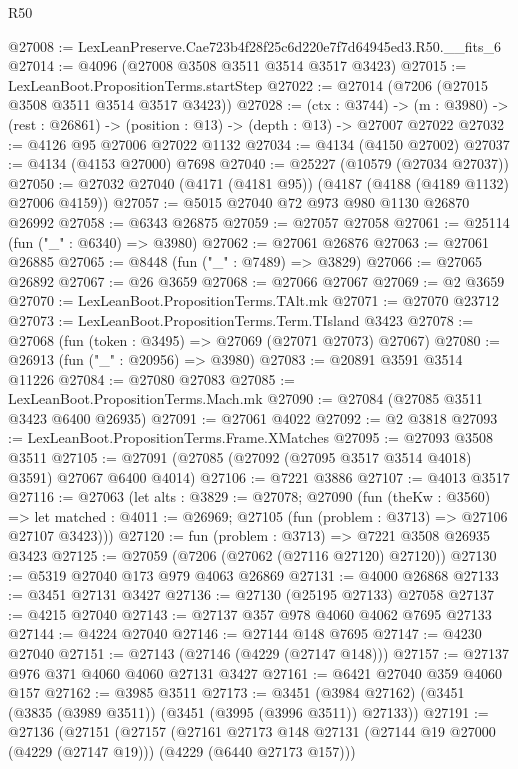 \begin{lexlean}{R50}
\begin{coremodule}
@27008 := LexLeanPreserve.Cae723b4f28f25c6d220e7f7d64945ed3.R50.__fits_6
@27014 := @4096 (@27008 @3508 @3511 @3514 @3517 @3423)
@27015 := LexLeanBoot.PropositionTerms.startStep
@27022 := @27014 (@7206 (@27015 @3508 @3511 @3514 @3517 @3423))
@27028 := (ctx : @3744) ->
  (m : @3980) -> (rest : @26861) -> (position : @13) -> (depth : @13) -> @27007 @27022
@27032 := @4126 @95 @27006 @27022 @1132
@27034 := @4134 (@4150 @27002)
@27037 := @4134 (@4153 @27000) @7698
@27040 := @25227 (@10579 (@27034 @27037))
@27050 := @27032 @27040 (@4171 (@4181 @95)) (@4187 (@4188 (@4189 @1132) @27006 @4159))
@27057 := @5015 @27040 @72 @973 @980 @1130 @26870 @26992
@27058 := @6343 @26875
@27059 := @27057 @27058
@27061 := @25114 (fun ("_" : @6340) => @3980)
@27062 := @27061 @26876
@27063 := @27061 @26885
@27065 := @8448 (fun ("_" : @7489) => @3829)
@27066 := @27065 @26892
@27067 := @26 @3659
@27068 := @27066 @27067
@27069 := @2 @3659
@27070 := LexLeanBoot.PropositionTerms.TAlt.mk
@27071 := @27070 @23712
@27073 := LexLeanBoot.PropositionTerms.Term.TIsland @3423
@27078 := @27068 (fun (token : @3495) => @27069 (@27071 @27073) @27067)
@27080 := @26913 (fun ("_" : @20956) => @3980)
@27083 := @20891 @3591 @3514 @11226
@27084 := @27080 @27083
@27085 := LexLeanBoot.PropositionTerms.Mach.mk
@27090 := @27084 (@27085 @3511 @3423 @6400 @26935)
@27091 := @27061 @4022
@27092 := @2 @3818
@27093 := LexLeanBoot.PropositionTerms.Frame.XMatches
@27095 := @27093 @3508 @3511
@27105 := @27091 (@27085 (@27092 (@27095 @3517 @3514 @4018) @3591) @27067 @6400 @4014)
@27106 := @7221 @3886
@27107 := @4013 @3517
@27116 := @27063
    (let alts : @3829 := @27078;
    @27090
      (fun (theKw : @3560) =>
      let matched : @4011 := @26969; @27105 (fun (problem : @3713) => @27106 @27107 @3423)))
@27120 := fun (problem : @3713) => @7221 @3508 @26935 @3423
@27125 := @27059 (@7206 (@27062 (@27116 @27120) @27120))
@27130 := @5319 @27040 @173 @979 @4063 @26869
@27131 := @4000 @26868
@27133 := @3451 @27131 @3427
@27136 := @27130 (@25195 @27133) @27058
@27137 := @4215 @27040
@27143 := @27137 @357 @978 @4060 @4062 @7695 @27133
@27144 := @4224 @27040
@27146 := @27144 @148 @7695
@27147 := @4230 @27040
@27151 := @27143 (@27146 (@4229 (@27147 @148)))
@27157 := @27137 @976 @371 @4060 @4060 @27131 @3427
@27161 := @6421 @27040 @359 @4060 @157
@27162 := @3985 @3511
@27173 := @3451 (@3984 @27162) (@3451 (@3835 (@3989 @3511)) (@3451 (@3995 (@3996 @3511)) @27133))
@27191 := @27136
    (@27151
      (@27157
        (@27161
          @27173
          @148
          @27131
          (@27144 @19 @27000 (@4229 (@27147 @19)))
          (@4229 (@6440 @27173 @157)))

\end{coremodule}
\end{lexlean}
